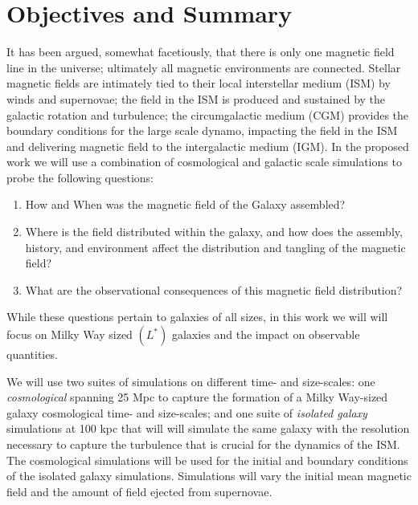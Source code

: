 \vspace{-6mm}
\section{Objectives and Summary}
\label{sec:objectives}
\vspace{-3mm}

It has been argued, somewhat facetiously, that there is only one magnetic field
line in the universe; ultimately all magnetic environments are connected.
Stellar magnetic fields are intimately tied to their local
interstellar medium (ISM) by winds and supernovae; the field in the ISM is
produced and sustained by the galactic
rotation and turbulence;  the circumgalactic medium (CGM) provides the boundary
conditions for the large scale dynamo, impacting the field in the ISM and
delivering magnetic field to the intergalactic medium (IGM).  
In the proposed
work we will use a combination of cosmological and galactic scale simulations to
probe the following questions:
\begin{enumerate}
    \item How and When was the magnetic field of the Galaxy assembled?
    \item Where is the field distributed within the galaxy, and how does the
        assembly, history, and environment affect the distribution and tangling
        of the magnetic field?
    \item What are the observational consequences of this magnetic field
        distribution? 
\end{enumerate}
While these questions pertain to galaxies of all sizes, in this work we will will
focus on Milky Way sized $(L^*)$ galaxies and the impact on observable quantities.

We will use two suites of simulations on different time- and size-scales:
one \emph{cosmological}
spanning 25 Mpc to
capture the formation of a Milky Way-sized galaxy cosmological time- and size-scales; and one suite of \emph{isolated galaxy} 
simulations at 100 kpc
that will will simulate the same galaxy with the resolution necessary to capture the turbulence that is
crucial for the dynamics of the ISM.  The cosmological simulations will be used
for the initial and boundary conditions of the isolated galaxy simulations.
Simulations will vary the initial mean magnetic field and the amount of field
ejected from supernovae.

